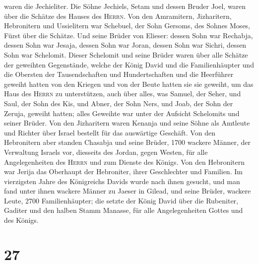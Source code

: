 waren die Jechieliter.  Die Söhne Jechiels, Setam und
dessen Bruder Joel, waren über die Schätze des Hauses des
\textsc{Herrn}.  Von den Amramitern, Jizharitern,
Hebronitern und Ussielitern war Schebuel,  der Sohn
Gersoms, des Sohnes Moses, Fürst über die Schätze.  Und
seine Brüder von Elieser: dessen Sohn war Rechabja, dessen Sohn war
Jesaja, dessen Sohn war Joran, dessen Sohn war Sichri, dessen Sohn war
Schelomit.  Dieser Schelomit und seine Brüder waren über
alle Schätze der geweihten Gegenstände, welche der König David und die
Familienhäupter und die Obersten der Tausendschaften und Hundertschaften
und die Heerführer geweiht hatten  von den Kriegen und
von der Beute hatten sie sie geweiht, um das Haus des \textsc{Herrn} zu
unterstützen,  auch über alles, was Samuel, der Seher,
und Saul, der Sohn des Kis, und Abner, der Sohn Ners, und Joab, der Sohn
der Zeruja, geweiht hatten; alles Geweihte war unter der Aufsicht
Schelomits und seiner Brüder.  Von den Jizharitern waren
Kenanja und seine Söhne als Amtleute und Richter über Israel bestellt
für das auswärtige Geschäft.  Von den Hebronitern aber
standen Chasabja und seine Brüder, 1700 wackere Männer, der Verwaltung
Israels vor, diesseits des Jordan, gegen Westen, für alle
Angelegenheiten des \textsc{Herrn} und zum Dienste des Königs.
 Von den Hebronitern war Jerija das Oberhaupt der
Hebroniter, ihrer Geschlechter und Familien. Im vierzigsten Jahre des
Königreichs Davids wurde nach ihnen gesucht, und man fand unter ihnen
wackere Männer zu Jaeser in Gilead,  und seine Brüder,
wackere Leute, 2700 Familienhäupter; die setzte der König David über die
Rubeniter, Gaditer und den halben Stamm Manasse, für alle
Angelegenheiten Gottes und des Königs.

\hypertarget{section-26}{%
\section{27}\label{section-26}}

